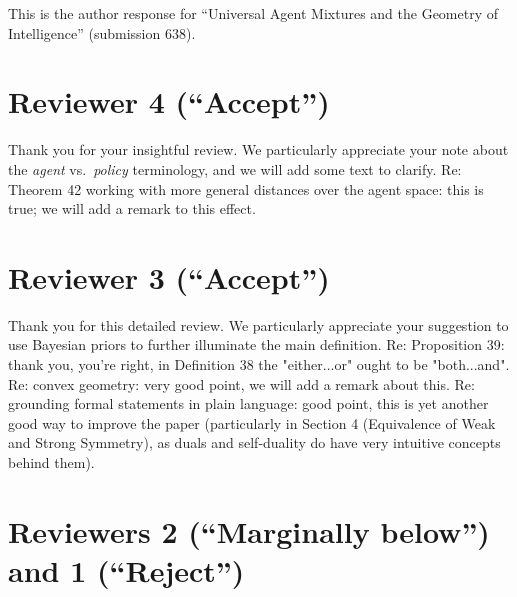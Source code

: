 \documentclass{article}
\begin{document}
This is the author response for ``Universal Agent Mixtures and the Geometry of Intelligence''
(submission 638).

\section*{Reviewer 4 (``Accept'')}

Thank you for your insightful review. We particularly appreciate your note about the \emph{agent} vs.\ \emph{policy} terminology, and we will add some text to clarify. Re: Theorem 42 working with more general distances over the agent space: this is true; we will add a remark to this effect.

\section*{Reviewer 3 (``Accept'')}

Thank you for this detailed review. We particularly appreciate your suggestion to use Bayesian priors to further illuminate the main definition. Re: Proposition 39: thank you, you're right, in Definition 38 the "either...or" ought to be "both...and". Re: convex geometry: very good point, we will add a remark about this. Re: grounding formal statements in plain language: good point, this is yet another good way to improve the paper (particularly in Section 4 (Equivalence of Weak and Strong Symmetry), as duals and self-duality do have very intuitive concepts behind them).

\section*{Reviewers 2 (``Marginally below'') and 1 (``Reject'')}
\end{document}
